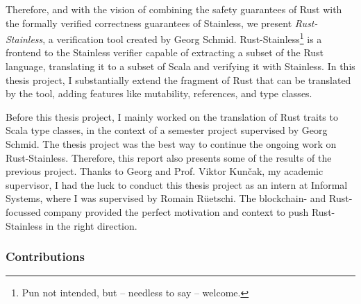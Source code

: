 Therefore, and with the vision of combining the safety guarantees of Rust with
the formally verified correctness guarantees of Stainless, we present
\emph{Rust-Stainless}, a verification tool created by Georg Schmid.
Rust-Stainless\footnote{Pun not intended, but -- needless to say -- welcome.} is
a frontend to the Stainless verifier capable of extracting a subset of the Rust
language, translating it to a subset of Scala and verifying it with Stainless.
In this thesis project, I substantially extend the fragment of Rust that can be
translated by the tool, adding features like mutability, references, and type
classes. \newpage

Before this thesis project, I mainly worked on the translation of Rust traits to
Scala type classes, in the context of a semester project supervised by Georg
Schmid. The thesis project was the best way to continue  the ongoing work on
Rust-Stainless. Therefore, this report also presents some of the results of the
previous project. Thanks to Georg and Prof. Viktor Kun\v{c}ak, my academic
supervisor, I had the luck to conduct this thesis project as an intern at
Informal Systems, where I was supervised by Romain Rüetschi. The blockchain- and
Rust-focussed company provided the perfect motivation and context to push
Rust-Stainless in the right direction.

\subsubsection{Contributions}

